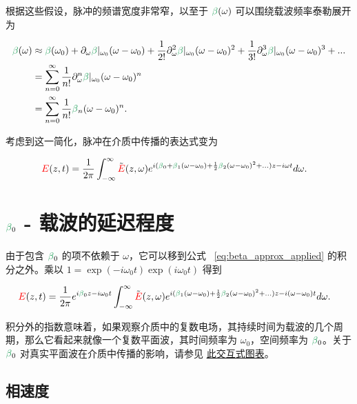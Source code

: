 根据这些假设，脉冲的频谱宽度非常窄，以至于 $\betag(\omega)$ 可以围绕载波频率泰勒展开为

\begin{align}
\label{eq:beta_approx}
    \betag(\omega)&\approx \betag(\omega_0)+\partial_\omega\betag|_{\omega_0}(\omega-\omega_0)+\frac{1}{2!}\partial^2_\omega\betag|_{\omega_0}(\omega-\omega_0)^2+
    \frac{1}{3!}\partial^3_\omega\betag|_{\omega_0}(\omega-\omega_0)^3+... \\ \nonumber
    &= \sum_{n=0}^{\infty} \frac{1}{n!}\partial^n_\omega\betag|_{\omega_0}(\omega-\omega_0)^n\\ \nonumber
    &=\sum_{n=0}^{\infty} \frac{1}{n!}\betag_n(\omega-\omega_0)^n.
\end{align}

考虑到这一简化，脉冲在介质中传播的表达式变为

\begin{align}
\label{eq:beta_approx_applied}
    \E(z,t) &= \frac{1}{2\pi}\int_{-\infty}^{\infty} \Tilde{\E}(z,\omega) e^{i(\betag_0+\betag_1(\omega-\omega_0)+\frac{1}{2}\betag_2(\omega-\omega_0)^2+...)z-i\omega t} d\omega.
\end{align}


\section{$\betag_0$ - 载波的延迟程度}

由于包含 $\betag_0$ 的项不依赖于 $\omega$，它可以移到公式 ~\ref{eq:beta_approx_applied} 的积分之外。乘以 $1=\exp(-i\omega_0t)\exp(i\omega_0t)$ 得到

\begin{align}
\label{eq:beta_approx_applied}
    \E(z,t) &= \frac{1}{2\pi} e^{i\betag_0z-i\omega_0t}  \int_{-\infty}^{\infty} \Tilde{\E}(z,\omega) e^{i(\betag_1(\omega-\omega_0)+\frac{1}{2}\betag_2(\omega-\omega_0)^2+...)z-i(\omega-\omega_0) t} d\omega.
\end{align}

积分外的指数意味着，如果观察介质中的复数电场，其持续时间为载波的几个周期，那么它看起来就像一个复数平面波，其时间频率为 $\omega_0$，空间频率为 $\betag_0$。关于 $\betag_0$ 对真实平面波在介质中传播的影响，请参见 \href{https://www.desmos.com/calculator/ausd1wnl2j}{此交互式图表}。

\subsection{相速度}
\label{sec:Phase_velocity}

